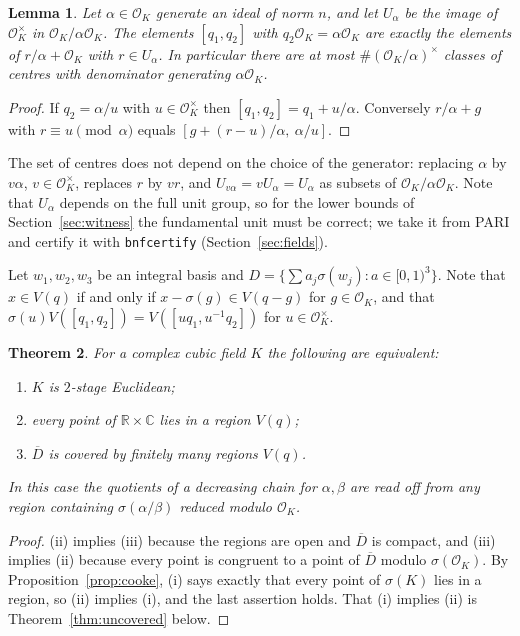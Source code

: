 \documentclass[11pt]{amsart}
\newtheorem{theorem}{Theorem}[section]
\newtheorem{lemma}[theorem]{Lemma}
\theoremstyle{definition}
\theoremstyle{remark}
\numberwithin{equation}{section}
\newcommand{\R}{\mathbb{R}}
\newcommand{\C}{\mathbb{C}}
\newcommand{\cO}{\mathcal{O}}
\begin{document}
\begin{lemma}\label{lem:classes}
Let $\alpha\in\cO_K$ generate an ideal of norm $n$, and let $U_\alpha$ be the image of
$\cO_K^\times$ in $\cO_K/\alpha\cO_K$. The elements $[q_1,q_2]$ with $q_2\cO_K=\alpha\cO_K$ are
exactly the elements of $r/\alpha+\cO_K$ with $r\in U_\alpha$. In particular there are at most
$\#(\cO_K/\alpha)^\times$ classes of centres with denominator generating $\alpha\cO_K$.
\end{lemma}

\begin{proof}
If $q_2=\alpha/u$ with $u\in\cO_K^\times$ then $[q_1,q_2]=q_1+u/\alpha$. Conversely
$r/\alpha+g$ with $r\equiv u\pmod\alpha$ equals $[g+(r-u)/\alpha,\ \alpha/u]$.
\end{proof}

The set of centres does not depend on the choice of the generator: replacing $\alpha$ by
$v\alpha$, $v\in\cO_K^\times$, replaces $r$ by $vr$, and $U_{v\alpha}=vU_\alpha=U_\alpha$ as subsets
of $\cO_K/\alpha\cO_K$. Note that $U_\alpha$ depends on the full unit group, so for the lower
bounds of Section~\ref{sec:witness} the fundamental unit must be correct; we take it from PARI
and certify it with \texttt{bnfcertify} (Section~\ref{sec:fields}).

Let $w_1,w_2,w_3$ be an integral basis and $D=\{\sum a_j\sigma(w_j): a\in[0,1)^3\}$. Note that
$x\in V(q)$ if and only if $x-\sigma(g)\in V(q-g)$ for $g\in\cO_K$, and that
$\sigma(u)V([q_1,q_2])=V([uq_1,u^{-1}q_2])$ for $u\in\cO_K^\times$.

\begin{theorem}\label{thm:equiv}
For a complex cubic field $K$ the following are equivalent:
\begin{enumerate}
\item[(i)] $K$ is $2$-stage Euclidean;
\item[(ii)] every point of $\R\times\C$ lies in a region $V(q)$;
\item[(iii)] $\overline D$ is covered by finitely many regions $V(q)$.
\end{enumerate}
In this case the quotients of a decreasing chain for $\alpha,\beta$ are read off from any
region containing $\sigma(\alpha/\beta)$ reduced modulo $\cO_K$.
\end{theorem}

\begin{proof}
(ii) implies (iii) because the regions are open and $\overline D$ is compact, and (iii) implies
(ii) because every point is congruent to a point of $\overline D$ modulo $\sigma(\cO_K)$. By
Proposition~\ref{prop:cooke}, (i) says exactly that every point of $\sigma(K)$ lies in a region,
so (ii) implies (i), and the last assertion holds. That (i) implies (ii) is
Theorem~\ref{thm:uncovered} below.
\end{proof}
\end{document}
